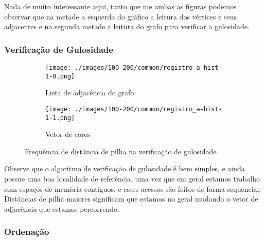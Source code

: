 \documentclass{article}
\begin{document}
Nada de muito interessante aqui, tanto que me ambas as figuras podemos observar que na metade a esquerda do gráfico a leitura dos vértices e seus adjacentes e na segunda metade a leitura do grafo para verificar a gulosidade.
        
\subsubsection{Verificação de Gulosidade}

\begin{figure}[H]
    \centering
    \hfill
    \begin{subfigure}[c]{0.4\textwidth}
        \centering
        \texttt{[image: ./images/100-200/common/registro\_a-hist-1-0.png]}
        \caption{Lista de adjacência do grafo}
        \label{fig:ac03}
    \end{subfigure}
    \hfill
    \begin{subfigure}[c]{0.4\textwidth}
        \centering
        \texttt{[image: ./images/100-200/common/registro\_a-hist-1-1.png]}
        \caption{Vetor de cores}
        \label{fig:ac04}
    \end{subfigure}
    \hfill
    \caption{Frequência de distância de pilha na verificação de gulosidade}

\end{figure}

Observe que o algoritmo de verificação de gulosidade é bem simples, e ainda possue uma boa localidade 
de referência, uma vez que em geral estamos trabalho com espaços de memória contíguos, e esses acessos 
são feitos de forma sequencial. Distâncias de pilha maiores significam que estamos no geral mudando o vetor 
de adjacência que estamos percorrendo.
\subsubsection{Ordenação}
\end{document}
